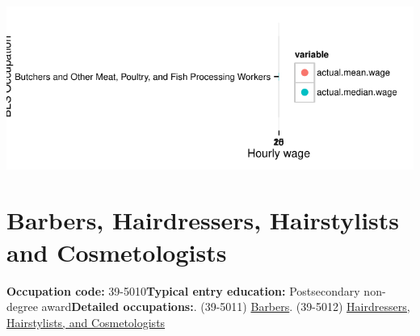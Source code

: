 \documentclass[a4paper,10pt]{article}\usepackage[]{graphicx}\usepackage[]{color}
\makeatletter
\def\maxwidth{ %
  \ifdim\Gin@nat@width>\linewidth
    \linewidth
  \else
    \Gin@nat@width
  \fi
}
\makeatother
\begin{document}
{\centering \includegraphics[width=\maxwidth]{figure/unnamed-chunk-290} 

}


\newpage\section{Barbers, Hairdressers, Hairstylists and Cosmetologists}\textbf{Occupation code:} 39-5010\newline\textbf{Typical entry education:} Postsecondary non-degree award\newline\textbf{Detailed occupations:}. (39-5011)  \href{http://www.bls.gov/oes/current/oes395011.htm}{Barbers}. (39-5012)  \href{http://www.bls.gov/oes/current/oes395012.htm}{Hairdressers, Hairstylists, and Cosmetologists}\newline%
\end{document}
